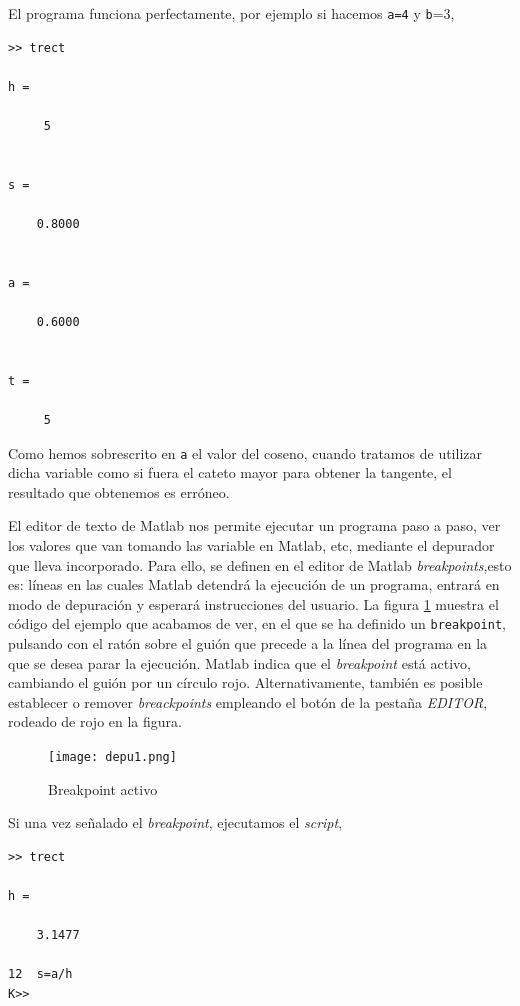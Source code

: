 \begin{enumerate}


%

El programa funciona perfectamente, por ejemplo si hacemos \texttt{a=4} y \texttt{b}=3,

\begin{verbatim}
>> trect

h =

     5


s =

    0.8000


a =

    0.6000


t =

     5
\end{verbatim}
Como hemos sobrescrito en \texttt{a} el valor del coseno, cuando tratamos de utilizar dicha variable como si fuera el cateto mayor para obtener la tangente, el resultado que obtenemos es erróneo.

El editor de texto de Matlab nos permite ejecutar un programa paso a paso, ver los valores que van tomando las variable en Matlab, etc, mediante el depurador que lleva incorporado. Para ello, se definen en el editor de Matlab \emph{breakpoints},esto es: líneas en las cuales Matlab detendrá la ejecución de un programa, entrará en modo de depuración y esperará instrucciones del usuario. La figura \ref{fig:depu1} muestra el código del ejemplo que acabamos de ver, en el que se ha definido un \texttt{breakpoint}, pulsando con el ratón sobre el guión que precede a la línea del programa en la que se desea parar la ejecución. Matlab indica que el \emph{breakpoint} está activo, cambiando el guión por un círculo rojo. Alternativamente, también es posible establecer o remover \emph{breackpoints} empleando el botón de la pestaña \emph{EDITOR}, rodeado de rojo en la figura.

\begin{figure}[h]
\centering
\texttt{[image: depu1.png]}
\caption{Breakpoint activo}
\label{fig:depu1}
\end{figure}

Si una vez señalado el \emph{breakpoint}, ejecutamos el \emph{script},
\begin{verbatim}
>> trect

h =

    3.1477

12  s=a/h
K>> 
\end{verbatim}


\end{enumerate}
